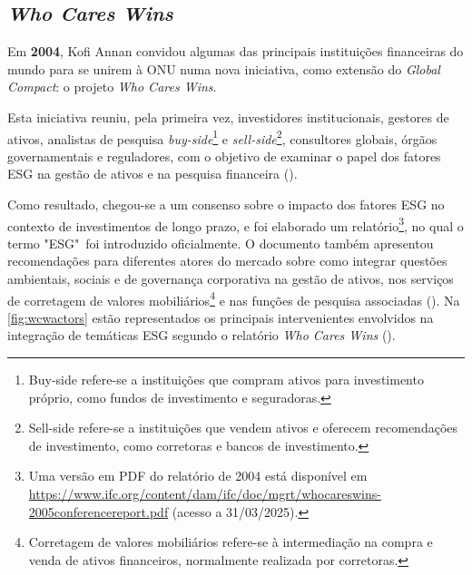 \subsection{\textit{Who Cares Wins}}
\label{subsec: WCW}

Em \textbf{2004}, Kofi Annan convidou algumas das principais instituições financeiras do mundo para se unirem à \gls{ONU} numa nova iniciativa, como extensão do \textit{Global Compact}: o projeto \textit{Who Cares Wins}.

Esta iniciativa reuniu, pela primeira vez, investidores institucionais, gestores de ativos, analistas de pesquisa \textit{buy-side}\footnote{Buy-side refere-se a instituições que compram ativos para investimento próprio, como fundos de investimento e seguradoras.} e \textit{sell-side}\footnote{Sell-side refere-se a instituições que vendem ativos e oferecem recomendações de investimento, como corretoras e bancos de investimento.}, consultores globais, órgãos governamentais e reguladores, com o objetivo de examinar o papel dos fatores \gls{ESG} na gestão de ativos e na pesquisa financeira (\cite{Pollman2024}).

Como resultado, chegou-se a um consenso sobre o impacto dos fatores \gls{ESG} no contexto de investimentos de longo prazo, e foi elaborado um relatório\footnote{Uma versão em PDF do relatório de 2004 está disponível em \url{https://www.ifc.org/content/dam/ifc/doc/mgrt/whocareswins-2005conferencereport.pdf} (acesso a 31/03/2025).}, no qual o termo "ESG"~foi introduzido oficialmente. O documento também apresentou recomendações para diferentes atores do mercado sobre como integrar questões ambientais, sociais e de governança corporativa na gestão de ativos, nos serviços de corretagem de valores mobiliários\footnote{Corretagem de valores mobiliários refere-se à intermediação na compra e venda de ativos financeiros, normalmente realizada por corretoras.} e nas funções de pesquisa associadas (\cite{onValues2005}). Na \autoref{fig:wcwactors} estão representados os principais intervenientes envolvidos na integração de temáticas \gls{ESG} segundo o relatório \textit{Who Cares Wins} (\cite{onValues2005}).

